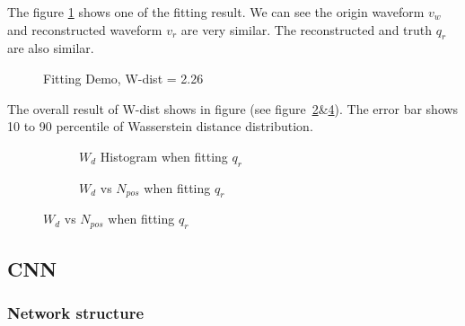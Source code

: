 The figure \ref{fig:fitting} shows one of the fitting result. We can see the origin waveform $v_{w}$ and reconstructed waveform $v_{r}$ are very similar. The reconstructed and truth $q_{r}$ are also similar. 
\begin{figure}[H]
    \centering
    \scalebox{0.4}{}
    \caption{\label{fig:fitting} Fitting Demo, W-dist = 2.26}
\end{figure}

The overall result of W-dist shows in figure (see figure~\ref{fig:fitting-hist}\&\ref{fig:fitting-npos}). The error bar shows 10 to 90 percentile of Wasserstein distance distribution. 

\begin{figure}[H]
\begin{minipage}[b]{.5\textwidth}
\begin{figure}[H]
    \centering
    \resizebox{\textwidth}{!}{}
    \caption{\label{fig:fitting-hist} $W_{d}$ Histogram when fitting $q_{r}$}
\end{figure}
\end{minipage}
\begin{minipage}[b]{.5\textwidth}
\begin{figure}[H]
    \centering
    \resizebox{\textwidth}{!}{}
    \caption{\label{fig:fitting-npos} $W_{d}$ vs $N_{pos}$ when fitting $q_{r}$}
\end{figure}
\end{minipage}
\end{figure}

\subsection{CNN}

\subsubsection{Network structure}

